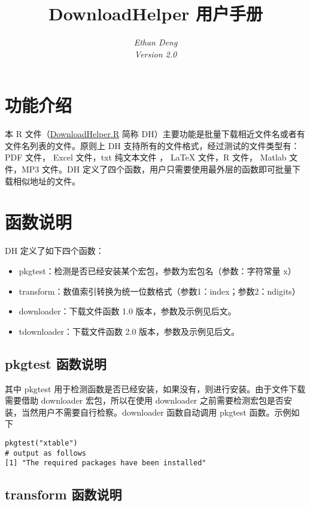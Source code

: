 \documentclass{article}
\title{\bfseries{\color{blue}Download}{\color{magenta}Helper} 用户手册}
\author{\Large\gara\itshape{{\color{blue}E}than {\color{magenta}D}eng} \\ Version 2.0}
\begin{document}
\maketitle
\section{功能介绍}

本 R 文件（\href{http://stack.ddswhu.com/R/download/downloadhelper.R}{DownloadHelper.R} 简称 DH）主要功能是批量下载相近文件名或者有文件名列表的文件。原则上 DH 支持所有的文件格式，经过测试的文件类型有：\textsf{PDF} 文件， \textsf{Excel} 文件，\textsf{txt} 纯文本文件 ， \textsf{LaTeX} 文件，\textsf{R} 文件， \textsf{Matlab} 文件，\textsf{MP3} 文件。DH 定义了四个函数，用户只需要使用最外层的函数即可批量下载相似地址的文件。

\section{函数说明}

DH 定义了如下四个函数：

\begin{itemize}
    \item pkgtest：检测是否已经安装某个宏包，参数为宏包名（参数：字符常量 x）
    \item transform：数值索引转换为统一位数格式（参数1：index；参数2：ndigits）
    \item downloader：下载文件函数 1.0 版本，参数及示例见后文。
    \item tdownloader：下载文件函数 2.0 版本，参数及示例见后文。
\end{itemize}

\subsection{pkgtest 函数说明}

其中 \textsf{pkgtest} 用于检测函数是否已经安装，如果没有，则进行安装。由于文件下载需要借助 \textsf{downloader} 宏包，所以在使用 \textsf{downloader} 之前需要检测宏包是否安装，当然用户不需要自行检察。\textsf{downloader} 函数自动调用 \textsf{pkgtest} 函数。示例如下

\begin{lstlisting}
pkgtest("xtable")
# output as follows
[1] "The required packages have been installed"
\end{lstlisting}

\subsection{transform 函数说明}
\end{document}
